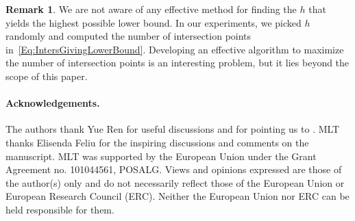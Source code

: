 \documentclass{article}
\theoremstyle{definition}
\newtheorem{remark}[theorem]{Remark}
\begin{document}
\begin{remark}
    We are not aware of any effective method for finding the $h$ that yields the highest possible lower bound. In our experiments, we picked $h$ randomly and computed the number of intersection points in~\eqref{Eq:IntersGivingLowerBound}. Developing an effective algorithm to maximize the number of intersection points is an interesting problem, but it lies beyond the scope of this paper.
\end{remark}


\color{black}

\paragraph{\textbf{Acknowledgements. }}
The authors thank Yue Ren for useful discussions and for pointing us to \cite[Lemma 2.7]{Bossinger2017}. MLT thanks Elisenda Feliu for the inspiring discussions and comments on the manuscript. MLT was supported by the European Union under the Grant Agreement no. 101044561, POSALG. Views and opinions expressed are those of the author(s) only and do not necessarily reflect those of the European Union or European Research Council (ERC). Neither the European Union nor ERC can be held responsible for them.
\end{document}
